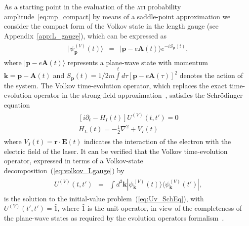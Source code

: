 As a starting point in the evaluation of the \textsc{ati} probability
amplitude~\ref{eq:mp_compact} by means of a saddle-point approximation
we consider the compact form of the Volkov state in the length gauge
(see Appendix~\ref{app:L_gauge}), which can be expressed
as~\cite{Becker_ati2002}
%
\begin{eqnarray}
\label{eq:volkov_Lgauge}
\begin{split}
|\psi_{\mathbf{p}}^{(V)}(t)\rangle & = &
|\mathbf{p} - e\mathbf{A}(t)\rangle e^{-i S_{\mathbf{p}}(t)},
\end{split}
\end{eqnarray}
%
where $|\mathbf{p} - e\mathbf{A}(t)\rangle$ represents a plane-wave
state with momentum $\mathbf{k} = \mathbf{p} - \mathbf{A}(t)$ and
$S_{\mathbf{p}}(t) = 1/2m \int\limits^{t} d\tau [\mathbf{p} -
  e\mathbf{A}(\tau)]^{2}$ denotes the action of the system. The Volkov
time-evolution operator, which replaces the exact time-evolution
operator in the strong-field approximation~\cite{KeldyshSFA},
satisfies the Schr\"{o}dinger equation
%
\begin{eqnarray}
  \label{eq:Uv_SchEq}
  \begin{split}
    [ i\partial_{t} - H_{I}(t) ] U^{(V)}(t,t') = 0 \\
    H_{L}(t) = -\frac{1}{2}\nabla^{2} + V_{I}(t)
  \end{split}
\end{eqnarray}
%
where $V_{I}(t) = \mathbf{r}\cdot\mathbf{E}(t)$ indicates the
interaction of the electron with the electric field of the laser. It
can be verified that the Volkov time-evolution operator, expressed in
terms of a Volkov-state decomposition~(\ref{eq:volkov_Lgauge}) by
%
\begin{eqnarray}
\label{eq:te_volkov}
\begin{split}
U^{(V)}(t,t') & = & \int d^{3}\mathbf{k}
|\psi_{\mathbf{k}}^{(V)}(t) \rangle
\langle \psi_{\mathbf{k}}^{(V)}(t')|,
\end{split}
\end{eqnarray}
%
is the solution to the initial-value problem~(\ref{eq:Uv_SchEq}), with
$U^{(V)}(t',t') = \hat{1}$, where $\hat{1}$ is the unit operator, in
view of the completeness of the plane-wave states as required by the
evolution operators formalism~\cite{BeckerTEOp_2006,cjp2010_keldysh}.


